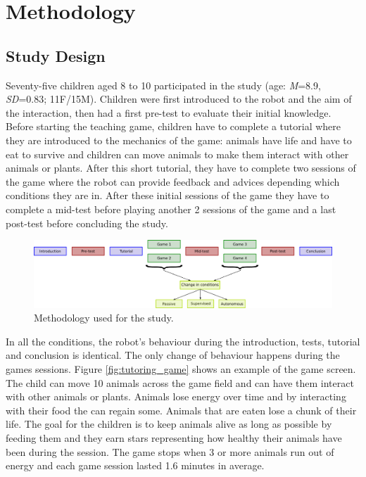 \section{Methodology}

\subsection{Study Design}

Seventy-five children aged 8 to 10 participated in the study (age: \textit{M}=8.9, \textit{SD}=0.83; 11F/15M).  Children were first introduced to the robot and the aim of the interaction, then had a first pre-test to evaluate their initial knowledge. Before starting the teaching game, children have to complete a tutorial where they are introduced to the mechanics of the game: animals have life and have to eat to survive and children can move animals to make them interact with other animals or plants. After this short tutorial, they have to complete two sessions of the game where the robot can provide feedback and advices depending which conditions they are in. After these initial sessions of the game they have to complete a mid-test before playing another 2 sessions of the game and a last post-test before concluding the study. 

\begin{figure}[h]
	\includegraphics[width=.9\linewidth]{graph.png}
	\centering
	\caption{Methodology used for the study.}
	\label{fig:method}
\end{figure}

In all the conditions, the robot's behaviour during the introduction, tests, tutorial and conclusion is identical. The only change of behaviour happens during the games sessions. Figure \ref{fig:tutoring_game} shows an example of the game screen. The child can move 10 animals across the game field and can have them interact with other animals or plants. Animals lose energy over time and by interacting with their food the can regain some. Animals that are eaten lose a chunk of their life. The goal for the children is to keep animals alive as long as possible by feeding them and they earn stars representing how healthy their animals have been during the session. The game stops when 3 or more animals run out of energy and each game session lasted 1.6 minutes in average.

